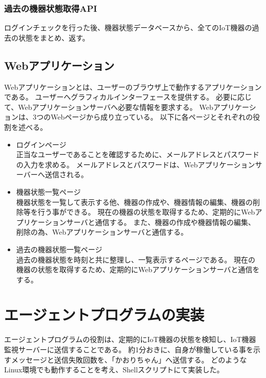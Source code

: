 \subsubsection{過去の機器状態取得API}
ログインチェックを行った後、機器状態データベースから、全てのIoT機器の過去の状態をまとめ、返す。

\subsection{Webアプリケーション}
Webアプリケーションとは、ユーザーのブラウザ上で動作するアプリケーションである。
ユーザーへグラフィカルインターフェースを提供する。
必要に応じて、Webアプリケーションサーバへ必要な情報を要求する。
Webアプリケーションは、3つのWebページから成り立っている。
以下に各ページとそれぞれの役割を述べる。
\begin{itemize}
	\item ログインページ\\
		正当なユーザーであることを確認するために、メールアドレスとパスワードの入力を求める。
		メールアドレスとパスワードは、Webアプリケーションサーバーへ送信される。
	\item 機器状態一覧ページ\\
		機器状態を一覧して表示する他、機器の作成や、機器情報の編集、機器の削除等を行う事ができる。
		現在の機器の状態を取得するため、定期的にWebアプリケーションサーバと通信する。
		また、機器の作成や機器情報の編集、削除の為、Webアプリケーションサーバと通信する。
	\item 過去の機器状態一覧ページ\\
		過去の機器状態を時刻と共に整理し、一覧表示するページである。
		現在の機器の状態を取得するため、定期的にWebアプリケーションサーバと通信をする。
\end{itemize}

\section{エージェントプログラムの実装}
エージェントプログラムの役割は、定期的にIoT機器の状態を検知し、IoT機器監視サーバーに送信することである。
約1分おきに、自身が稼働している事を示すメッセージと送信失敗回数を、「かおりちゃん」へ送信する。
どのようなLinux環境でも動作することを考え、Shellスクリプトにて実装した。

